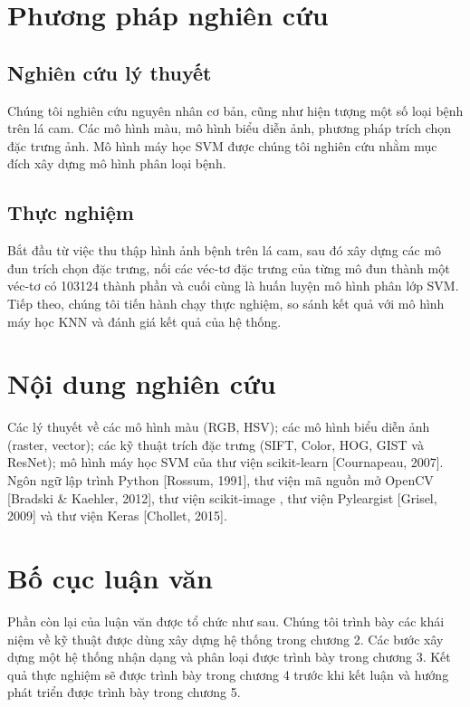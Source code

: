 \section{Phương pháp nghiên cứu}
\subsection{Nghiên cứu lý thuyết}
Chúng tôi nghiên cứu nguyên nhân cơ bản, cũng như hiện tượng một số loại bệnh trên lá cam. Các mô hình màu, mô hình biểu diễn ảnh, phương pháp trích chọn đặc trưng ảnh. Mô hình máy học SVM được chúng tôi nghiên cứu nhằm mục đích xây dựng mô hình phân loại bệnh.

\subsection{Thực nghiệm}
Bắt đầu từ việc thu thập hình ảnh bệnh trên lá cam, sau đó xây dựng các mô đun trích chọn đặc trưng, nối các véc-tơ đặc trưng của từng mô đun thành một véc-tơ có 103124 thành phần và cuối cùng là huấn luyện mô hình phân lớp SVM. Tiếp theo, chúng tôi tiến hành chạy thực nghiệm, so sánh kết quả với mô hình máy học KNN và đánh giá kết quả của hệ thống.


\section{Nội dung nghiên cứu}
Các lý thuyết về các mô hình màu (RGB, HSV); các mô hình biểu diễn ảnh (raster, vector); các kỹ thuật trích đặc trưng (SIFT, Color, HOG, 	GIST và ResNet); mô hình máy học SVM của thư viện scikit-learn [Cournapeau, 2007]. Ngôn ngữ lập trình Python [Rossum, 1991], thư viện mã nguồn mở OpenCV [Bradski \& Kaehler, 2012], thư viện scikit-image \cite{scikit-image}, thư viện Pyleargist [Grisel, 2009] và thư viện Keras [Chollet, 2015].


\section{Bố cục luận văn}
Phần còn lại của luận văn được tổ chức như sau. Chúng tôi trình bày các khái niệm về kỹ thuật được dùng xây dựng hệ thống trong chương 2. Các bước xây dựng một hệ thống nhận dạng và phân loại được trình bày trong chương 3. Kết quả thực nghiệm sẽ được trình bày trong chương 4 trước khi kết luận và hướng phát triển được trình bày trong chương 5.







